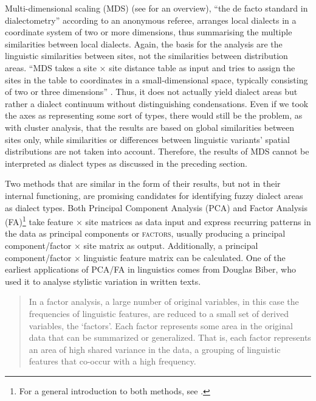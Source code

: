 \documentclass[output=paper]{LSP/langsci}
\begin{document}
Multi-dimensional scaling (MDS) (see \citealt[245]{wieling_advances_2015} for an overview), “the de facto standard in dialectometry” according to an anonymous referee, arranges local dialects in a coordinate system of two or more dimensions, thus summarising the multiple similarities between local dialects. Again, the basis for the analysis are the linguistic similarities between sites, not the similarities between distribution areas. “MDS takes a site × site distance table as input and tries to assign the sites in the table to coordinates in a small-dimensional space, typically consisting of two or three dimensions” \citep[245]{wieling_advances_2015}. Thus, it does not actually yield dialect areas but rather a dialect continuum without distinguishing condensations. Even if we took the axes as representing some sort of types, there would still be the problem, as with cluster analysis, that the results are based on global similarities between sites only, while similarities or differences between linguistic variants’ spatial distributions are not taken into account. Therefore, the results of MDS cannot be interpreted as dialect types as discussed in the preceding section.

Two methods that are similar in the form of their results, but not in their internal functioning, are promising candidates for identifying fuzzy dialect areas as dialect types. Both Principal Component Analysis (PCA) and Factor Analysis (FA)\footnote{For a general introduction to both methods, see \citet{tabachnick_using_2012}.} take feature × site matrices as data input and express recurring patterns in the data as principal components or \textsc{factors}, usually producing a principal component/factor × site matrix as output. Additionally, a principal component/factor × linguistic feature matrix can be calculated. One of the earliest applications of PCA/FA in linguistics comes from Douglas Biber, who used it to analyse stylistic variation in written texts.

\begin{quote}
In a factor analysis, a large number of original variables, in this case the frequencies of linguistic features, are reduced to a small set of derived variables, the `factors'. Each factor represents some area in the original data that can be summarized or generalized. That is, each factor represents an area of high shared variance in the data, a grouping of linguistic features that co-occur with a high frequency. \citep[79]{biber_variation_1988}
\end{quote}
\end{document}
